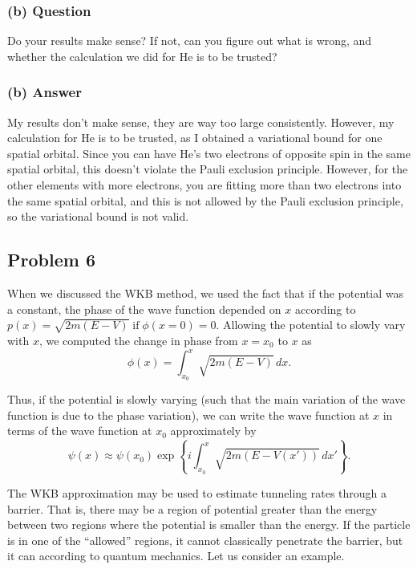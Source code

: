 \documentclass{article}
\begin{document}
\subsubsection*{(b) Question}
Do your results make sense? If not, can you figure out what is wrong, and whether the calculation we did for He is to be trusted?

\subsubsection*{(b) Answer}
My results don't make sense, they are way too large consistently. However, my calculation for He is to be trusted, as I obtained a variational bound for one spatial orbital. Since you can have He's two electrons of opposite spin in the same spatial orbital, this doesn't violate the Pauli exclusion principle. However, for the other elements with more electrons, you are fitting more than two electrons into the same spatial orbital, and this is not allowed by the Pauli exclusion principle, so the variational bound is not valid.

\subsection*{Problem 6}
When we discussed the WKB method, we used the fact that if the potential was a constant, the phase of the wave function depended on \( x \) according to \( p(x) = \sqrt{2m(E-V)}\; \text{if}\; \phi(x = 0) = 0 \). Allowing the potential to slowly vary with \( x \), we computed the change in phase from \( x = x_0 \) to \( x \) as
\begin{equation}
    \phi(x) = \int_{x_0}^{x} \sqrt{2m(E-V)}\,dx.
\end{equation}

Thus, if the potential is slowly varying (such that the main variation of the wave function is due to the phase variation), we can write the wave function at \( x \) in terms of the wave function at \( x_0 \) approximately by
\begin{equation}
    \psi(x) \approx \psi(x_0) \exp \left\{ i \int_{x_0}^{x} \sqrt{2m(E-V(x'))}\,dx' \right\}.
\end{equation}

The WKB approximation may be used to estimate tunneling rates through a barrier. That is, there may be a region of potential greater than the energy between two regions where the potential is smaller than the energy. If the particle is in one of the ``allowed'' regions, it cannot classically penetrate the barrier, but it can according to quantum mechanics. Let us consider an example.
\end{document}
